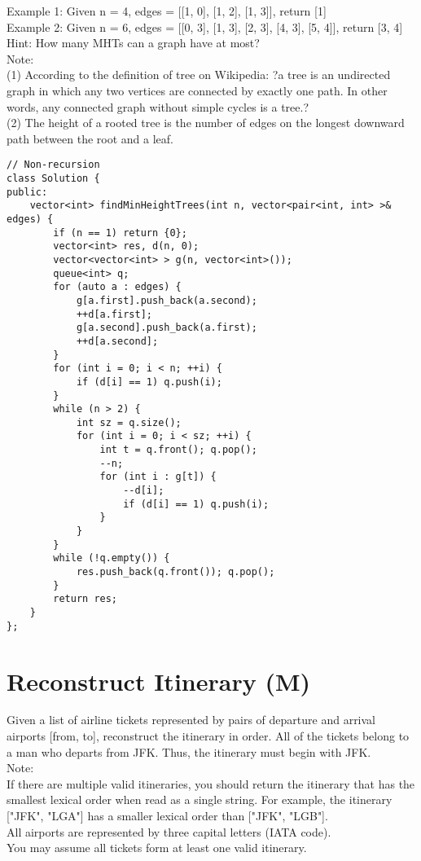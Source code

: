 Example 1:
Given n = 4, edges = [[1, 0], [1, 2], [1, 3]], return [1]\\
Example 2:
Given n = 6, edges = [[0, 3], [1, 3], [2, 3], [4, 3], [5, 4]], return [3, 4]\\

Hint:
    How many MHTs can a graph have at most?\\
    
Note:\\
(1) According to the definition of tree on Wikipedia: ?a tree is an undirected graph in which any two vertices are connected by exactly one path. In other words, any connected graph without simple cycles is a tree.?\\
(2) The height of a rooted tree is the number of edges on the longest downward path between the root and a leaf. \\

\begin{lstlisting}
// Non-recursion
class Solution {
public:
    vector<int> findMinHeightTrees(int n, vector<pair<int, int> >& edges) {
        if (n == 1) return {0};
        vector<int> res, d(n, 0);
        vector<vector<int> > g(n, vector<int>());
        queue<int> q;
        for (auto a : edges) {
            g[a.first].push_back(a.second);
            ++d[a.first];
            g[a.second].push_back(a.first);
            ++d[a.second];
        }
        for (int i = 0; i < n; ++i) {
            if (d[i] == 1) q.push(i);
        }
        while (n > 2) {
            int sz = q.size();
            for (int i = 0; i < sz; ++i) {
                int t = q.front(); q.pop();
                --n;
                for (int i : g[t]) {
                    --d[i];
                    if (d[i] == 1) q.push(i);
                }
            }
        }
        while (!q.empty()) {
            res.push_back(q.front()); q.pop();
        }
        return res;
    }
};
\end{lstlisting}


\section{Reconstruct Itinerary (M)}
Given a list of airline tickets represented by pairs of departure and arrival airports [from, to], reconstruct the itinerary in order. All of the tickets belong to a man who departs from JFK. Thus, the itinerary must begin with JFK.\\

Note:\\
    If there are multiple valid itineraries, you should return the itinerary that has the smallest lexical order when read as a single string. For example, the itinerary ["JFK", "LGA"] has a smaller lexical order than ["JFK", "LGB"].\\
    All airports are represented by three capital letters (IATA code).\\
    You may assume all tickets form at least one valid itinerary.\\

